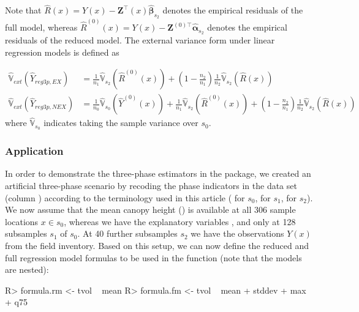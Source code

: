\documentclass[article]{jss}
\newcommand{\var}{\mathbb{V}}
\begin{document}
Note that $\hat{R}(x)=Y(x)-\pmb{Z}^{\top}(x)\hat{\pmb{\beta}}_{s_2}$ denotes the empirical residuals of the full model, whereas $\hat{R}^{(0)}(x)=Y(x)-\pmb{Z}^{(0)\top}\hat{\pmb{\alpha}}_{s_2}$ denotes the empirical residuals of the reduced model. The external variance form under linear regression models is defined as

\begin{subequations}\label{eq:extvar_reg3p}
\begin{align}
\hat{\var}_{ext}(\hat{Y}_{reg3p,EX})&=\frac{1}{n_1}\hat{\var}_{s_2}(\hat{R}^{(0)}(x)) + (1-\frac{n_2}{n_1})\frac{1}{n_2}\hat{\var}_{s_2}(\hat{R}(x))\label{eq:extvar_reg3p_ex} \\
\hat{\var}_{ext}(\hat{Y}_{reg3p,NEX})&=\frac{1}{n_0}\hat{\var}_{s_0}(\hat{Y}^{(0)}(x))
+\frac{1}{n_1}\hat{\var}_{s_2}(\hat{R}^{(0)}(x)) + (1-\frac{n_2}{n_1})\frac{1}{n_2}\hat{\var}_{s_2}(\hat{R}(x)) \label{eq:extvar_reg3p_nex}
\end{align}
\end{subequations}
where $\hat{\var}_{s_0}$ indicates taking the sample variance over $s_0$.


\subsubsection{Application}

In order to demonstrate the three-phase estimators in the package, we created an artificial three-phase scenario by recoding the phase indicators in the  data set (column ) according to the terminology used in this article ( for $s_0$,  for $s_1$,  for $s_2$). We now assume that the mean canopy height () is available at all 306 sample locations $x \in s_0$, whereas we have the explanatory variables ,  and  only at 128 subsamples $s_1$ of $s_0$. At 40 further subsamples $s_2$ we have the observations $Y(x)$ from the field inventory. Based on this setup, we can now define the reduced and full regression model formulas to be used in the  function (note that the models are nested):


\begin{Schunk}
\begin{Sinput}
R> formula.rm <- tvol ~ mean
R> formula.fm <- tvol ~ mean + stddev + max + q75
\end{Sinput}
\end{Schunk}
\end{document}
